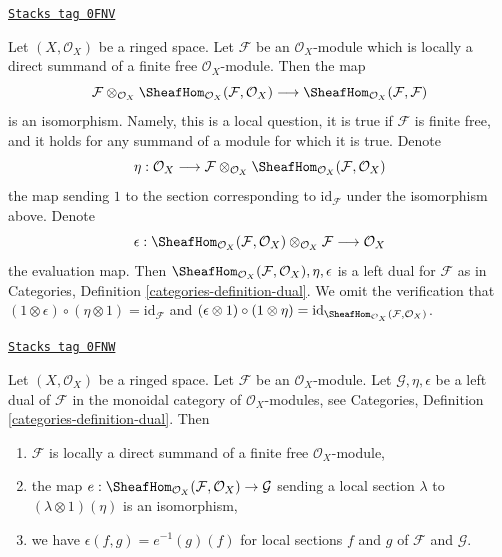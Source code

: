 \begin{example}[Dual]
\label{modules-example-dual}
\href{https://stacks.math.columbia.edu/tag/0FNV}{\texttt{Stacks tag 0FNV}}

Let $(X, \mathcal{O}_X)$ be a ringed space. Let $\mathcal{F}$
be an $\mathcal{O}_X$-module which is locally a direct summand of a finite
free $\mathcal{O}_X$-module. Then the map
$$
\mathcal{F} \otimes_{\mathcal{O}_X}
\SheafHom_{\mathcal{O}_X}(\mathcal{F}, \mathcal{O}_X)
\longrightarrow
\SheafHom_{\mathcal{O}_X}(\mathcal{F}, \mathcal{F})
$$
is an isomorphism. Namely, this is a local question, it is true
if $\mathcal{F}$ is finite free, and it holds for any summand
of a module for which it is true. Denote
$$
\eta :
\mathcal{O}_X
\longrightarrow
\mathcal{F} \otimes_{\mathcal{O}_X}
\SheafHom_{\mathcal{O}_X}(\mathcal{F}, \mathcal{O}_X)
$$
the map sending $1$ to the section corresponding to
$\text{id}_\mathcal{F}$ under the isomorphism above.
Denote
$$
\epsilon :
\SheafHom_{\mathcal{O}_X}(\mathcal{F}, \mathcal{O}_X)
\otimes_{\mathcal{O}_X} \mathcal{F}
\longrightarrow
\mathcal{O}_X
$$
the evaluation map. Then
$\SheafHom_{\mathcal{O}_X}(\mathcal{F}, \mathcal{O}_X), \eta, \epsilon$
is a left dual for $\mathcal{F}$ as in
Categories, Definition \ref{categories-definition-dual}.
We omit the verification that
$(1 \otimes \epsilon) \circ (\eta \otimes 1) = \text{id}_\mathcal{F}$
and
$(\epsilon \otimes 1) \circ (1 \otimes \eta) =
\text{id}_{\SheafHom_{\mathcal{O}_X}(\mathcal{F}, \mathcal{O}_X)}$.
\end{example}

\begin{lemma}
\label{modules-lemma-left-dual-module}
\href{https://stacks.math.columbia.edu/tag/0FNW}{\texttt{Stacks tag 0FNW}}

Let $(X, \mathcal{O}_X)$ be a ringed space. Let $\mathcal{F}$ be an
$\mathcal{O}_X$-module. Let $\mathcal{G}, \eta, \epsilon$
be a left dual of $\mathcal{F}$ in the monoidal category of
$\mathcal{O}_X$-modules, see
Categories, Definition \ref{categories-definition-dual}. Then
\begin{enumerate}
\item $\mathcal{F}$ is locally a direct summand of a finite free
$\mathcal{O}_X$-module,
\item the map
$e : \SheafHom_{\mathcal{O}_X}(\mathcal{F}, \mathcal{O}_X) \to \mathcal{G}$
sending a local section $\lambda$ to $(\lambda \otimes 1)(\eta)$
is an isomorphism,
\item we have $\epsilon(f, g) = e^{-1}(g)(f)$ for local sections
$f$ and $g$ of $\mathcal{F}$ and $\mathcal{G}$.
\end{enumerate}
\end{lemma}

